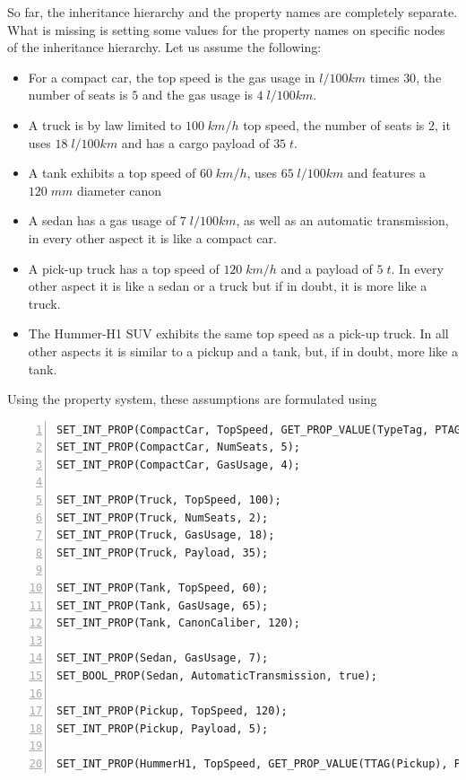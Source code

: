 \noindent
So far, the inheritance hierarchy and the property names are completely
separate. What is missing is setting some values for the property
names on specific nodes of the inheritance hierarchy. Let us assume
the following:
\begin{itemize}
\item For a compact car, the top speed is the gas usage in $l/100km$
  times $30$, the number of seats is $5$ and the gas usage is
  $4\;l/100km$.
\item A truck is by law limited to $100\;km/h$ top speed, the number
  of seats is $2$, it uses $18\;l/100km$ and has a cargo payload of
  $35\;t$.
\item A tank exhibits a top speed of $60\;km/h$, uses $65\;l/100km$
  and features a $120\;mm$ diameter canon 
\item A sedan has a gas usage of $7\;l/100km$, as well as an automatic
  transmission, in every other aspect it is like a compact car.
\item A pick-up truck has a top speed of $120\;km/h$ and a payload of
  $5\;t$. In every other aspect it is like a sedan or a truck but if in
  doubt, it is more like a truck.
\item The Hummer-H1 SUV exhibits the same top speed as a pick-up
  truck.  In all other aspects it is similar to a pickup and a tank,
  but, if in doubt, more like a tank.
\end{itemize}

\noindent
Using the \Dumux property system, these assumptions are formulated
using
\begin{lstlisting}[name=propsyscars,basicstyle=\ttfamily\scriptsize,numbers=left,numberstyle=\tiny, numbersep=5pt]
SET_INT_PROP(CompactCar, TopSpeed, GET_PROP_VALUE(TypeTag, PTAG(GasUsage)) * 30);
SET_INT_PROP(CompactCar, NumSeats, 5);
SET_INT_PROP(CompactCar, GasUsage, 4);

SET_INT_PROP(Truck, TopSpeed, 100);
SET_INT_PROP(Truck, NumSeats, 2);
SET_INT_PROP(Truck, GasUsage, 18);
SET_INT_PROP(Truck, Payload, 35);

SET_INT_PROP(Tank, TopSpeed, 60);
SET_INT_PROP(Tank, GasUsage, 65);
SET_INT_PROP(Tank, CanonCaliber, 120);

SET_INT_PROP(Sedan, GasUsage, 7);
SET_BOOL_PROP(Sedan, AutomaticTransmission, true);

SET_INT_PROP(Pickup, TopSpeed, 120);
SET_INT_PROP(Pickup, Payload, 5);

SET_INT_PROP(HummerH1, TopSpeed, GET_PROP_VALUE(TTAG(Pickup), PTAG(TopSpeed)));
\end{lstlisting}

